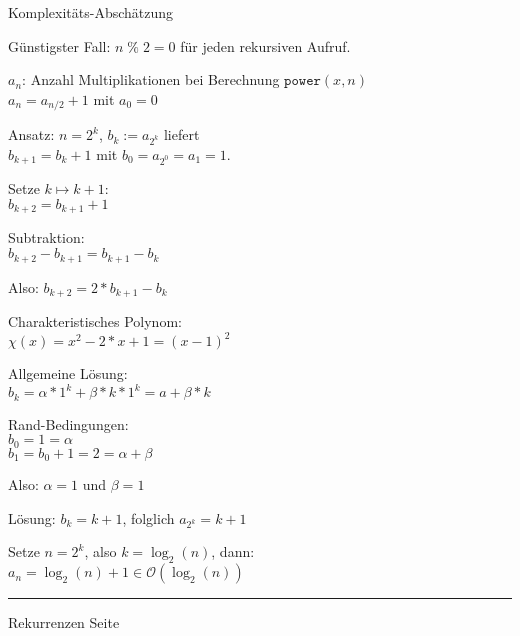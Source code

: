 \documentclass{slides}
\newcounter{mypage}
\newcommand{\Oh}{\mathcal{O}}
\begin{document}

\begin{slide}{}
\normalsize

\begin{center}
Komplexit\"ats-Absch\"atzung
\end{center}
\vspace*{0.5cm}

\footnotesize
G\"unstigster Fall:  $n\;\%\;2 = 0$ f\"ur jeden rekursiven Aufruf.

$a_n$: Anzahl Multiplikationen bei Berechnung $\mathtt{power}(x,n)$ \\[0.3cm]
\hspace*{1.3cm} $a_n = a_{n/2} + 1$ \quad mit $a_0 = 0$
 
Ansatz: $n = 2^k$, $b_k := a_{2^k}$ liefert \\[0.3cm]
\hspace*{1.3cm} $b_{k+1} = b_k + 1$ \quad mit $b_0 = a_{2^0} = a_1 = 1$.

Setze $k \mapsto k + 1$: \\[0.3cm]
\hspace*{1.3cm} $b_{k+2} = b_{k+1} + 1$

Subtraktion: \\[0.3cm]
\hspace*{1.3cm} $b_{k+2} - b_{k+1} = b_{k+1} - b_k$ 

Also: $b_{k+2} = 2 * b_{k+1} - b_k$

Charakteristisches Polynom: \\[0.3cm]
\hspace*{1.3cm} $\chi(x) = x^2 - 2 * x + 1 = (x-1)^2$

Allgemeine L\"osung: \\[0.3cm]
\hspace*{1.3cm} $b_k = \alpha * 1^k + \beta * k * 1^k = a + \beta * k$

Rand-Bedingungen: \\[0.3cm]
\hspace*{1.3cm} $b_0 = 1 = \alpha$ \\[0.3cm]
\hspace*{1.3cm} $b_1 = b_0 + 1 = 2 = \alpha + \beta$

Also: $\alpha = 1$ und $\beta = 1$

L\"osung: $b_k = k + 1$, folglich $a_{2^k} = k + 1$

Setze $n = 2^k$, also $k = \log_2(n)$, dann: \\[0.3cm]
\hspace*{1.3cm} $a_n = \log_2(n) + 1 \in \Oh\left(\log_2(n)\right)$



\vspace*{\fill}
\tiny \addtocounter{mypage}{1}
\rule{17cm}{1mm}
Rekurrenzen  \hspace*{\fill} Seite 
\end{slide}
\end{document}
